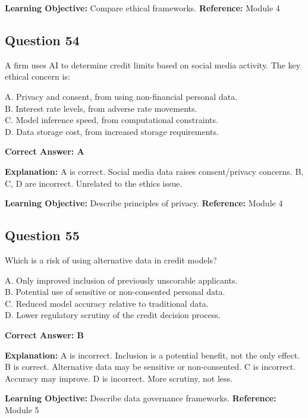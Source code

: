 \documentclass[11pt]{article}
\begin{document}
	\textbf{Learning Objective:} Compare ethical frameworks.
	\textbf{Reference:} Module 4
	
	\subsection*{Question 54}
	A firm uses AI to determine credit limits based on social media
	activity. The key ethical concern is:
	
	A. Privacy and consent, from using non-financial personal data.\\
	B. Interest rate levels, from adverse rate movements.\\
	C. Model inference speed, from computational constraints.\\
	D. Data storage cost, from increased storage requirements.
	
	\vspace{0.4em}
	\textbf{Correct Answer: A}
	
	\textbf{Explanation:}
	A is correct. Social media data raises consent/privacy concerns.
	B, C, D are incorrect. Unrelated to the ethics issue.
	
	\textbf{Learning Objective:} Describe principles of privacy.
	\textbf{Reference:} Module 4
	
	\subsection*{Question 55}
	Which is a risk of using alternative data in credit models?
	
	A. Only improved inclusion of previously unscorable applicants.\\
	B. Potential use of sensitive or non-consented personal data.\\
	C. Reduced model accuracy relative to traditional data.\\
	D. Lower regulatory scrutiny of the credit decision process.
	
	\vspace{0.4em}
	\textbf{Correct Answer: B}
	
	\textbf{Explanation:}
	A is incorrect. Inclusion is a potential benefit, not the only effect.
	B is correct. Alternative data may be sensitive or non-consented.
	C is incorrect. Accuracy may improve.
	D is incorrect. More scrutiny, not less.
	
	\textbf{Learning Objective:} Describe data governance frameworks.
	\textbf{Reference:} Module 5
	
\end{document}
